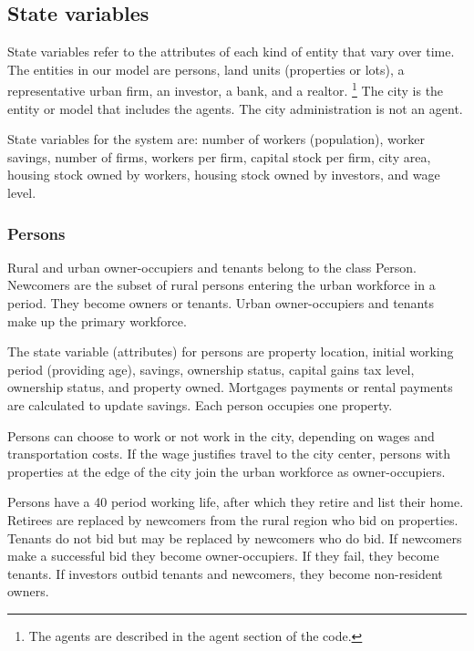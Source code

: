 \subsection{State variables}
State variables refer to the attributes of each kind of entity that vary over time.%
The entities in our model are persons, land units (properties or lots), a representative urban firm, an investor, a bank, and a realtor.
\footnote{The agents are described in the agent section of the code.} The city is the entity or model that includes the agents. The city administration is not an agent. %

State variables for the system are: number of workers (population),  worker savings, number of firms, workers per firm, capital stock per firm, city area, housing stock owned by workers, housing stock owned by investors, and wage level.

\subsubsection{Persons}
Rural and urban owner-occupiers and tenants belong to the class Person. Newcomers are the subset of rural persons entering the urban workforce in a period. They become owners or tenants. Urban owner-occupiers and tenants make up the primary workforce. %

The state variable (attributes) for persons are property location, initial working period (providing age), savings, ownership status, capital gains tax level, ownership status, and property owned. Mortgages payments or rental payments are calculated to update savings. Each person occupies one property. 

Persons can choose to work or not work in the city, depending on wages and transportation costs. If the wage justifies travel to the city center, persons with properties at the edge of the city join the urban workforce as owner-occupiers. 

Persons have a 40 period working life, after which they retire and list their home.  
Retirees are replaced by newcomers from the rural region who bid on properties. Tenants do not bid but may be replaced by newcomers who do bid. If newcomers make a successful bid they become owner-occupiers. If they fail, they become tenants. If investors outbid tenants and newcomers, they become non-resident owners.  

